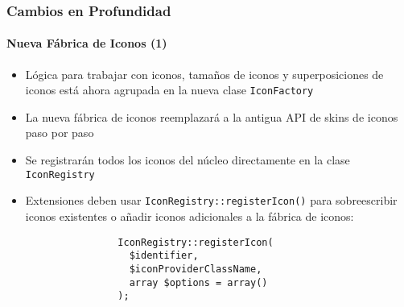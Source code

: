 \begin{frame}[fragile]
	\frametitle{Cambios en Profundidad}
	\framesubtitle{Nueva Fábrica de Iconos (1)}

	\lstset{basicstyle=\smaller\ttfamily}

	\begin{itemize}

		\item Lógica para trabajar con iconos, tamaños de iconos y superposiciones de iconos está ahora agrupada en
			la nueva clase \texttt{IconFactory}

		\item La nueva fábrica de iconos reemplazará a la antigua API de skins de iconos paso por paso

		\item Se registrarán todos los iconos del núcleo directamente en la clase \texttt{IconRegistry}

		\item Extensiones deben usar \texttt{IconRegistry::registerIcon()} para sobreescribir iconos
			existentes o añadir iconos adicionales a la fábrica de iconos:

			\begin{lstlisting}
				IconRegistry::registerIcon(
				  $identifier,
				  $iconProviderClassName,
				  array $options = array()
				);
			\end{lstlisting}

	\end{itemize}

\end{frame}


